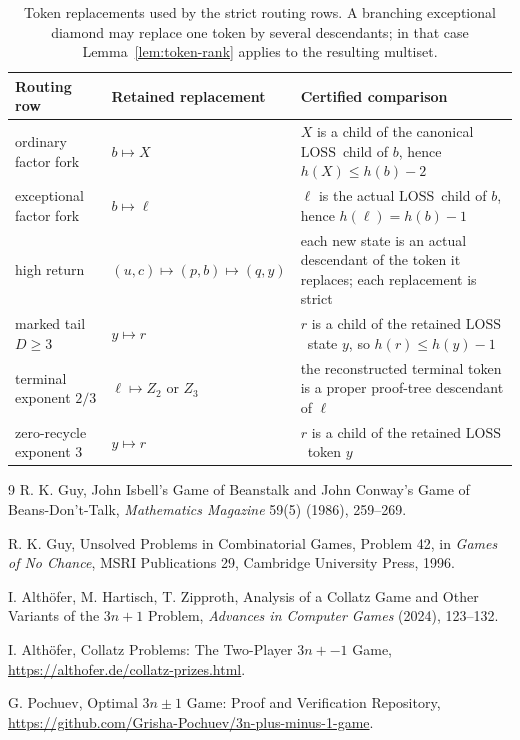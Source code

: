 \documentclass[11pt]{article}
\newcommand{\LOSS}{\ensuremath{\mathrm{LOSS}}}
\begin{document}
\begin{table}[ht]
\centering
\small
\begin{tabular}{@{}p{.23\linewidth}p{.29\linewidth}p{.37\linewidth}@{}}
\toprule
Routing row & Retained replacement & Certified comparison \\
\midrule
ordinary factor fork & $b\mapsto X$ & $X$ is a child of the canonical
  \LOSS\ child of $b$, hence $h(X)\le h(b)-2$ \\
exceptional factor fork & $b\mapsto \ell$ & $\ell$ is the actual \LOSS\
  child of $b$, hence $h(\ell)=h(b)-1$ \\
high return & $(u,c)\mapsto(p,b)\mapsto(q,y)$ & each new state is an actual
  descendant of the token it replaces; each replacement is strict \\
marked tail $D\ge3$ & $y\mapsto r$ & $r$ is a child of the retained
  \LOSS\ state $y$, so $h(r)\le h(y)-1$ \\
terminal exponent $2/3$ & $\ell\mapsto Z_2$ or $Z_3$ & the reconstructed
  terminal token is a proper proof-tree descendant of $\ell$ \\
zero-recycle exponent $3$ & $y\mapsto r$ & $r$ is a child of the retained
  \LOSS\ token $y$ \\
\bottomrule
\end{tabular}
\caption{Token replacements used by the strict routing rows. A branching
exceptional diamond may replace one token by several descendants; in that
case Lemma~\ref{lem:token-rank} applies to the resulting multiset.}
\label{tab:tokens}
\end{table}

\begin{thebibliography}{9}
R. K. Guy, John Isbell's Game of Beanstalk and John Conway's Game of
Beans-Don't-Talk, \emph{Mathematics Magazine} 59(5) (1986), 259--269.

R. K. Guy, Unsolved Problems in Combinatorial Games, Problem 42, in
\emph{Games of No Chance}, MSRI Publications 29, Cambridge University Press,
1996.

I. Alth\"ofer, M. Hartisch, T. Zipproth, Analysis of a Collatz Game and Other
Variants of the $3n+1$ Problem, \emph{Advances in Computer Games} (2024),
123--132.

I. Alth\"ofer, Collatz Problems: The Two-Player $3n+-1$ Game,
\url{https://althofer.de/collatz-prizes.html}.

G. Pochuev, Optimal $3n\pm1$ Game: Proof and Verification Repository,
\url{https://github.com/Grisha-Pochuev/3n-plus-minus-1-game}.
\end{thebibliography}
\end{document}
